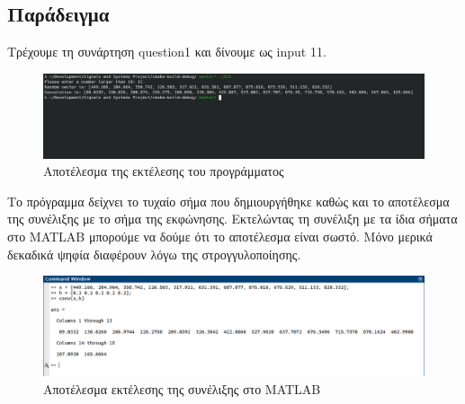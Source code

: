 \documentclass[12pt,a4paper]{article}
\begin{document}
    \subsection{Παράδειγμα}
    Τρέχουμε τη συνάρτηση question1 και δίνουμε ως input 11.
    \begin{figure}[H]
        \includegraphics[width=\linewidth]{res1.png}
        \caption{Αποτέλεσμα της εκτέλεσης του προγράμματος}
    \end{figure}
    Το πρόγραμμα δείχνει το τυχαίο σήμα που δημιουργήθηκε καθώς και το αποτέλεσμα της συνέλιξης με το σήμα της εκφώνησης.
    Εκτελώντας τη συνέλιξη με τα ίδια σήματα στο MATLAB μπορούμε να δούμε ότι το αποτέλεσμα είναι σωστό. Μόνο μερικά δεκαδικά ψηφία 
    διαφέρουν λόγω της στρογγυλοποίησης.
    \begin{figure}[H]
        \includegraphics[width=\linewidth]{res2.png}
        \caption{Αποτέλεσμα εκτέλεσης της συνέλιξης στο MATLAB}
    \end{figure}
\end{document}
